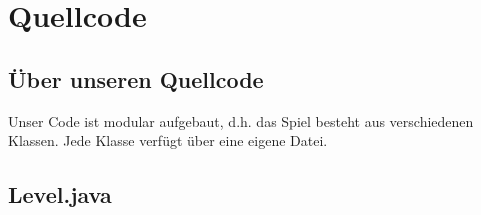 \section{Quellcode}
\subsection{Über unseren Quellcode}
Unser Code ist modular aufgebaut, d.h. das Spiel besteht aus verschiedenen Klassen. Jede Klasse
verfügt über eine eigene Datei.
\subsection{Level.java}
\fontsize{8pt}{10pt}\selectfont
